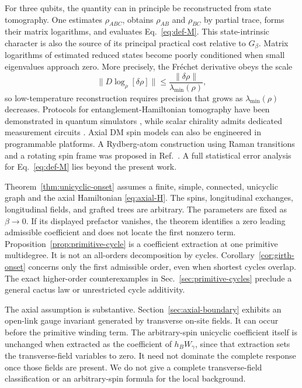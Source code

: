 \documentclass[11pt]{article}
\begin{document}
For three qubits, the quantity can in principle be reconstructed from state
tomography.  One estimates $\rho_{ABC}$, obtains $\rho_{AB}$ and $\rho_{BC}$
by partial trace, forms their matrix logarithms, and evaluates
Eq.~\eqref{eq:def-M}.  This state-intrinsic character
is also the source of its principal practical cost relative to $G_\beta$.
Matrix logarithms of estimated reduced states become poorly conditioned when small eigenvalues
approach zero.  More precisely, the Fr\'echet derivative obeys the scale
\begin{equation}
 \|D\log_\rho[\delta\rho]\|
 \le \frac{\|\delta\rho\|}{\lambda_{\min}(\rho)},
 \label{eq:log-conditioning}
\end{equation}
so low-temperature reconstruction requires precision that grows as
$\lambda_{\min}(\rho)$ decreases.  Protocols for entanglement-Hamiltonian
tomography have been demonstrated in quantum
simulators \cite{KokailEtAl2021}, while scalar chirality admits dedicated
measurement circuits \cite{ReascosEtAl2023}.  Axial DM spin models can also
be engineered in programmable platforms.  A Rydberg-atom construction using
Raman transitions and a rotating spin frame was proposed in
Ref.~\cite{KunimiEtAl2024}.  A full statistical error analysis for
Eq.~\eqref{eq:def-M} lies beyond the present work.

Theorem~\ref{thm:unicyclic-onset} assumes a finite, simple, connected,
unicyclic graph and the axial Hamiltonian \eqref{eq:axial-H}.  The spins,
longitudinal exchanges, longitudinal fields, and grafted trees are arbitrary.
The parameters are fixed as $\beta\to0$.  If its displayed prefactor
vanishes, the theorem identifies a zero leading admissible coefficient and
does not locate the first nonzero term.  Proposition~\ref{prop:primitive-cycle}
is a coefficient extraction at one primitive multidegree.  It is not an
all-orders decomposition by cycles.  Corollary~\ref{cor:girth-onset} concerns
only the first admissible order, even when shortest cycles overlap.  The exact
higher-order counterexamples in Sec.~\ref{sec:primitive-cycles} preclude a
general cactus law or unrestricted cycle additivity.

The axial assumption is substantive.  Section~\ref{sec:axial-boundary}
exhibits an open-link gauge invariant generated by transverse on-site fields.
It can occur before the primitive winding term.  The arbitrary-spin
unicyclic coefficient itself is unchanged when extracted as the coefficient
of $h_BW_\gamma$, since that extraction sets the transverse-field variables to
zero.  It need not dominate the complete response once those fields are
present.  We do not give a complete transverse-field classification or an
arbitrary-spin formula for the local background.
\end{document}
